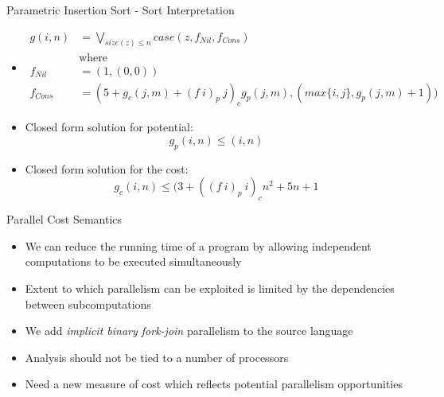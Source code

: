 \documentclass[pdf]{beamer}
\begin{document}
\begin{frame}{Parametric Insertion Sort - Sort Interpretation}
  \begin{itemize}
    \item[]
      \small
      \begin{align*}
      g(i, n) &= \bigvee\limits_{size(z)\leq n} case(z, f_{Nil}, f_{Cons}) \\
              &\text{where}\\
      f_{Nil} &= (1, (0,0)) \\
    f_{Cons} &= (5 + g_c(j,m) + (f\ i)_p\ j)_c g_p(j,m), (max\{i,j\},g_p(j,m) + 1))
      \end{align*}
    \item Closed form solution for potential:
      \[g_p(i,n) \leq (i, n)\]
    \item Closed form solution for the cost:
      \[g_c(i,n) \leq (3 + ((f\ i)_p\ i)_c n^2 + 5n + 1\]
  \end{itemize}

\end{frame}


\begin{frame}{Parallel Cost Semantics}
  \begin{itemize}
    \vfill
    \item We can reduce the running time of a program by allowing independent
      computations to be executed simultaneously
    \vfill
    \item Extent to which parallelism can be exploited is limited by the
      dependencies between subcomputations
    \vfill
    \item We add \textit{implicit binary fork-join} parallelism to the source language
    \vfill
    \item Analysis should not be tied to a number of processors
    \vfill
    \item Need a new measure of cost which reflects potential parallelism
      opportunities
    \vfill
  \end{itemize}
\end{frame}
\end{document}
